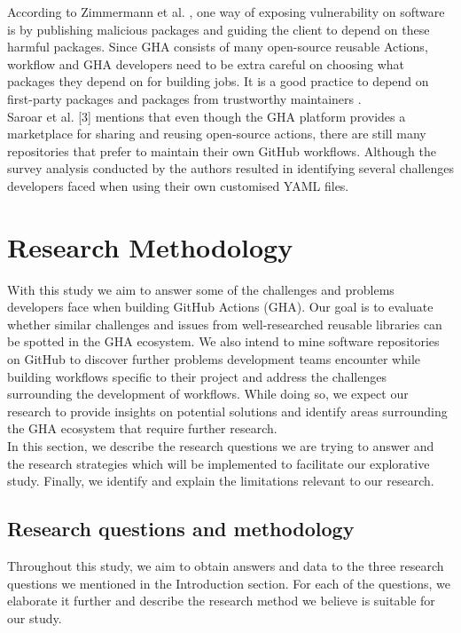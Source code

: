 \documentclass[conference]{IEEEtran}
\begin{document}
 According to Zimmermann et al. \cite{b12}, one way of exposing vulnerability on software is by publishing malicious packages and guiding the client to depend on these harmful packages. Since GHA consists of many open-source reusable Actions, workflow and GHA developers need to be extra careful on choosing what packages they depend on for building jobs. It is a good practice to depend on first-party packages and packages from trustworthy maintainers \cite{b12}. \\

Saroar et al. [3] mentions that even though the GHA platform provides a marketplace for sharing and reusing open-source actions, there are still many repositories that prefer to maintain their own GitHub workflows. Although the survey analysis conducted by the authors resulted in identifying several challenges developers faced when using their own customised YAML files. 


\section{Research Methodology}
With this study we aim to answer some of the challenges and problems developers face when building GitHub Actions (GHA). Our goal is to evaluate whether similar challenges and issues from well-researched reusable libraries can be spotted in the GHA ecosystem. We also intend to mine software repositories on GitHub to discover further problems development teams encounter while building workflows specific to their project and address the challenges surrounding the development of workflows. While doing so, we expect our research to provide insights on potential solutions and identify areas surrounding the GHA ecosystem that require further research.\\

In this section, we describe the research questions we are trying to answer and the research strategies which will be implemented to facilitate our explorative study. Finally, we identify and explain the limitations relevant to our research.

\subsection{Research questions and methodology}
Throughout this study, we aim to obtain answers and data to the three research questions we mentioned in the Introduction section. For each of the questions, we elaborate it further and describe the research method we believe is suitable for our study.\\
\end{document}
